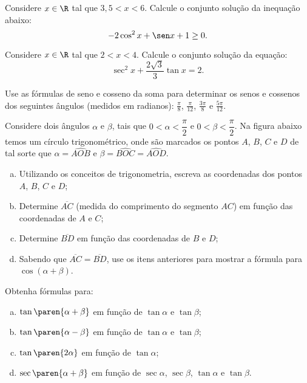 \begin{exercise}
    Considere $x \in \R$ tal que $3{,}5 < x < 6$.
    Calcule o conjunto solução da inequação abaixo:
     $$-2 \cos^2 x + \sen x + 1 \geq 0.$$
\end{exercise}

\begin{exercise}
    Considere $x \in \R$ tal que $2 < x < 4$.
    Calcule o conjunto solução da equação:
    $$\sec^2 x + \dfrac{2 \sqrt 3}{3} \tan x = 2.$$
\end{exercise}

\begin{exercise}
    Use as fórmulas de seno e cosseno da soma para determinar os
senos e cossenos dos seguintes ângulos (medidos em radianos): $\frac
{\pi} 8$, $\frac{\pi} {12}$, $\frac {3\pi} 8$ e $\frac{5\pi}{12}$.
\end{exercise}

\begin{exercise}
  Considere dois ângulos $\alpha$ e $\beta$, tais que $0 < \alpha < \dfrac \pi 2$ e $0 < \beta < \dfrac \pi 2$. Na figura abaixo temos um círculo trigonométrico, onde são marcados os pontos $A$, $B$, $C$ e $D$ de tal sorte que $\alpha = \widehat{AOB}$ e $\beta = \widehat{BOC} = \widehat{AOD}$.
  \begin{center}
    \label{fig:cos-da-soma}
  \end{center}
  \begin{enumerate}[a)]
    \item Utilizando os conceitos de trigonometria, escreva as coordenadas dos pontos $A$, $B$, $C$ e $D$;
    \item Determine $\overline{AC}$ (medida do comprimento do segmento $AC$) em função das coordenadas de $A$ e $C$;
    \item Determine $\overline{BD}$ em função das coordenadas de $B$ e $D$;
    \item Sabendo que $\overline{AC} = \overline{BD}$, use os itens anteriores para mostrar a fórmula para $\cos (\alpha + \beta)$.
    \end{enumerate}
\end{exercise}

\begin{exercise}
    Obtenha fórmulas para: 
    \begin{enumerate}[a)]
      \item $\tan\paren{\alpha + \beta}$ em função de $\tan \alpha$ e $\tan \beta$;
      \item $\tan\paren{\alpha - \beta}$ em função de $\tan \alpha$ e $\tan \beta$;
      \item $\tan\paren{2 \alpha}$ em função de $\tan \alpha$;
      \item $\sec \paren{\alpha + \beta}$ em função de $\sec \alpha$, $\sec \beta$, $\tan \alpha$ e $\tan \beta$.
    \end{enumerate}
\end{exercise}

